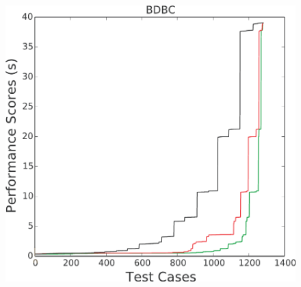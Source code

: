 \documentclass[conference]{IEEEtran}
\begin{document}
\begin{figure}[htbp!]
\begin{minipage}{0.30\linewidth}
\end{minipage}
\begin{minipage}{0.30\linewidth}
\includegraphics[width=\linewidth]{_figs/BDBC.pdf}
\end{minipage}\\[0.25cm]


\end{figure}
\end{document}
